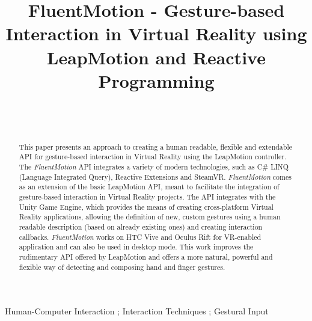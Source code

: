 \documentclass[chi_draft]{sigchi}
\def\fluentmotion{\textit{FluentMotion}}
\def\rx{Reactive Extensions}
\def\unity{Unity Game Engine}
\def\leap{LeapMotion}
\def\vr{Virtual Reality}
\def\steamvr{SteamVR}
\def\vive{HTC Vive}
\def\oculus{Oculus Rift}
\begin{document}

\title{FluentMotion - Gesture-based Interaction in Virtual Reality using LeapMotion and Reactive Programming}

\author{
  \\
  \\
}

\maketitle

\begin{abstract}
  This paper presents an approach to creating a human readable, flexible and extendable API for gesture-based interaction in Virtual Reality using the \leap{} controller. The \fluentmotion{} API integrates a variety of modern technologies, such as C\# LINQ (Language Integrated Query), \rx{} and \steamvr{}. \fluentmotion{} comes as an extension of the basic \leap{} API, meant to facilitate the integration of gesture-based interaction in Virtual Reality projects. The API integrates with the \unity{}, which provides the means of creating cross-platform \vr{} applications, allowing the definition of new, custom gestures using a human readable description (based on already existing ones) and creating interaction callbacks. \fluentmotion{} works on \vive{} and \oculus{} for VR-enabled application and can also be used in desktop mode. This work improves the rudimentary API offered by \leap{} and offers a more natural, powerful and flexible way of detecting and composing hand and finger gestures.
\end{abstract}


 {Human-Computer Interaction} ; {Interaction Techniques} ; {Gestural Input}
\end{document}

